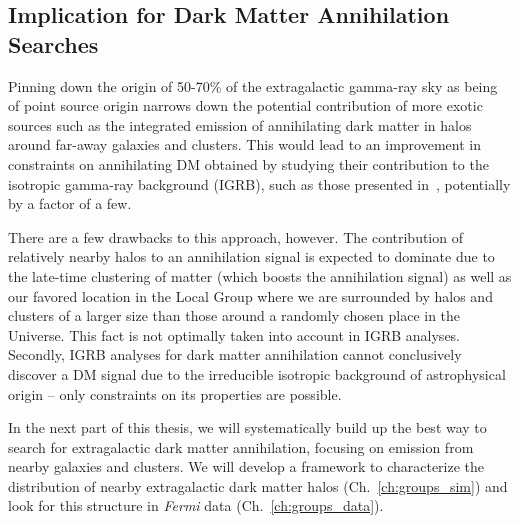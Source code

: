 \subsection{Implication for Dark Matter Annihilation Searches}

Pinning down the origin of 50-70\% of the extragalactic gamma-ray sky as being of point source origin narrows down the potential contribution of more exotic sources such as the integrated emission of annihilating dark matter in halos around far-away galaxies and clusters. This would lead to an improvement in constraints on annihilating DM obtained by studying their contribution to the isotropic gamma-ray background (IGRB), such as those presented in~\cite{Ackermann:2015tah,Ajello:2015mfa}, potentially by a factor of a few. 

There are a few drawbacks to this approach, however. The contribution of relatively nearby halos to an annihilation signal is expected to dominate due to the late-time clustering of matter (which boosts the annihilation signal) as well as our favored location in the Local Group where we are surrounded by halos and clusters of a larger size than those around a randomly chosen place in the Universe. This fact is not optimally taken into account in IGRB analyses. Secondly, IGRB analyses for dark matter annihilation cannot conclusively discover a DM signal due to the irreducible isotropic background of astrophysical origin -- only constraints on its properties are possible. 

In the next part of this thesis, we will systematically build up the best way to search for extragalactic dark matter annihilation, focusing on emission from nearby galaxies and clusters. We will develop a framework to characterize the distribution of nearby extragalactic dark matter halos (Ch.~\ref{ch:groups_sim}) and look for this structure in \emph{Fermi} data (Ch.~\ref{ch:groups_data}).

\sectionline


